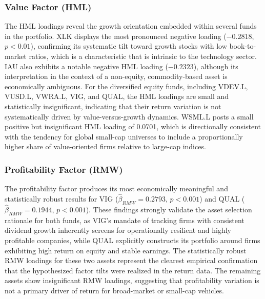 \documentclass[12pt]{article}
\begin{document}
\subsubsection{Value Factor (HML)}
The HML loadings reveal the growth orientation embedded within several funds in the portfolio. XLK displays the most pronounced negative loading ($-0.2818$, $p < 0.01$), confirming its systematic tilt toward growth stocks with low book-to-market ratios, which is a characteristic that is intrinsic to the technology sector. IAU also exhibits a notable negative HML loading ($-0.2323$), although its interpretation in the context of a non-equity, commodity-based asset is economically ambiguous. For the diversified equity funds, including VDEV.L, VUSD.L, VWRA.L, VIG, and QUAL, the HML loadings are small and statistically insignificant, indicating that their return variation is not systematically driven by value-versus-growth dynamics. WSML.L posts a small positive but insignificant HML loading of 0.0701, which is directionally consistent with the tendency for global small-cap universes to include a proportionally higher share of value-oriented firms relative to large-cap indices.

\subsubsection{Profitability Factor (RMW)}
The profitability factor produces its most economically meaningful and statistically robust results for VIG ($\hat{\beta}_{RMW} = 0.2793$, $p < 0.001$) and QUAL ($\hat{\beta}_{RMW} = 0.1944$, $p < 0.001$). These findings strongly validate the asset selection rationale for both funds, as VIG's mandate of tracking firms with consistent dividend growth inherently screens for operationally resilient and highly profitable companies, while QUAL explicitly constructs its portfolio around firms exhibiting high return on equity and stable earnings. The statistically robust RMW loadings for these two assets represent the clearest empirical confirmation that the hypothesized factor tilts were realized in the return data. The remaining assets show insignificant RMW loadings, suggesting that profitability variation is not a primary driver of return for broad-market or small-cap vehicles.
\end{document}
